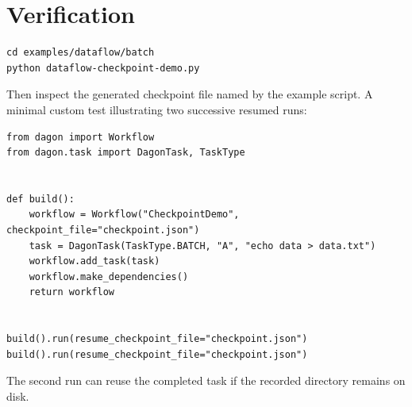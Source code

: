 \section{Verification}

\begin{lstlisting}[style=bash]
cd examples/dataflow/batch
python dataflow-checkpoint-demo.py
\end{lstlisting}

Then inspect the generated checkpoint file named by the example script. A
minimal custom test illustrating two successive resumed runs:

\begin{lstlisting}
from dagon import Workflow
from dagon.task import DagonTask, TaskType


def build():
    workflow = Workflow("CheckpointDemo", checkpoint_file="checkpoint.json")
    task = DagonTask(TaskType.BATCH, "A", "echo data > data.txt")
    workflow.add_task(task)
    workflow.make_dependencies()
    return workflow


build().run(resume_checkpoint_file="checkpoint.json")
build().run(resume_checkpoint_file="checkpoint.json")
\end{lstlisting}

The second run can reuse the completed task if the recorded directory
remains on disk.
